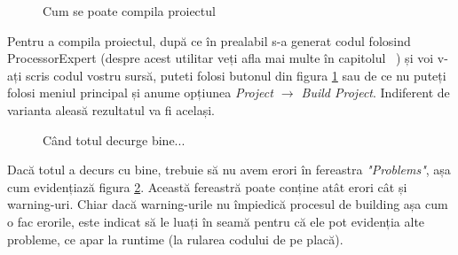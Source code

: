 \begin{figure}
    \vspace{-50pt}
    \vspace{-30pt}
    \caption{\label{fig:CodeWarrior-CompilareProiect} Cum se poate compila proiectul}
    \vspace{-10pt}
\end{figure}

Pentru a compila proiectul, după ce în prealabil s-a generat codul folosind ProcessorExpert (despre acest utilitar veți afla mai multe în capitolul ~\textit{}) și voi v-ați scris codul vostru sursă, puteti folosi butonul din figura \ref{fig:CodeWarrior-CompilareProiect} sau de ce nu puteți folosi meniul principal și anume opțiunea \textit{Project $\rightarrow$ Build Project}. Indiferent de varianta aleasă rezultatul va fi același.

\begin{figure}
    \vspace{-20pt}
    \vspace{-20pt}
    \caption{\label{fig:CodeWarrior-FereastraProblems} Când totul decurge bine...}
    \vspace{-10pt}
\end{figure}

Dacă totul a decurs cu bine, trebuie să nu avem erori în fereastra \textit{"Problems"}, așa cum evidențiază figura \ref{fig:CodeWarrior-FereastraProblems}. Această fereastră poate conține atât erori cât și warning-uri. Chiar dacă warning-urile nu împiedică procesul de building așa cum o fac erorile, este indicat să le luați în seamă pentru că ele pot evidenția alte probleme, ce apar la runtime (la rularea codului de pe placă).

\newpage

